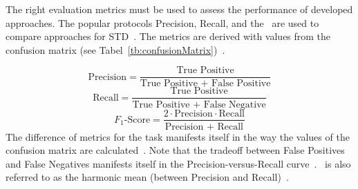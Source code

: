 The right evaluation metrics must be used to assess the performance of developed approaches.
The popular protocols Precision, Recall, and the \fone\ are used to compare
approaches for \ac{STD}~\citep{long_scene_2021}.
The metrics are derived with values from the confusion matrix (see
Tabel~\ref{tb:confusionMatrix})~\citep{davis_relationship_2006}.
\begin{table}[ht]
    \centering\scriptsize
    \caption{Confusion matrix\label{tb:confusionMatrix}}
\end{table}
\begin{equation}\label{eq:P}
    \text{Precision}=\frac{\text{True Positive}}{\text{True Positive + False Positive}}
\end{equation}
\begin{equation}\label{eq:R}
    \text{Recall}=\frac{\text{True Positive}}{\text{True Positive + False Negative}}
\end{equation}
\begin{equation}\label{eq:f1}
    F_1\text{-Score}=\frac{2\cdot \text{Precision}\cdot \text{Recall}}{\text{Precision + Recall}}
\end{equation}
The difference of metrics for the task manifests itself in the way the values of the confusion matrix
are calculated~\citep{long_scene_2021}.
Note that the tradeoff between False Positives and False Negatives manifests itself in the
Precision-versus-Recall curve~\citep{su_relationship_2015}.
\fone\ is also referred to as the harmonic mean (between Precision and
Recall)~\citep{he_icpr2018_2018}.
